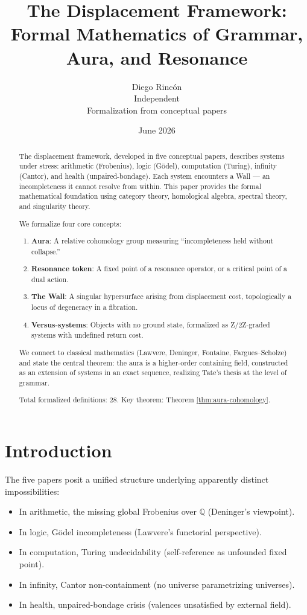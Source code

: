 \documentclass[12pt]{article}
\title{The Displacement Framework: Formal Mathematics of Grammar, Aura, and Resonance}
\author{Diego Rinc\'on\\
\small Independent\\
\small Formalization from conceptual papers}
\date{June 2026}
\theoremstyle{definition}
\theoremstyle{remark}
\begin{document}
\maketitle

\begin{abstract}
The displacement framework, developed in five conceptual papers, describes systems under stress: arithmetic (Frobenius), logic (G\"odel), computation (Turing), infinity (Cantor), and health (unpaired-bondage). Each system encounters a Wall --- an incompleteness it cannot resolve from within. This paper provides the formal mathematical foundation using category theory, homological algebra, spectral theory, and singularity theory.

We formalize four core concepts:
\begin{enumerate}
\item \textbf{Aura}: A relative cohomology group measuring ``incompleteness held without collapse.''
\item \textbf{Resonance token}: A fixed point of a resonance operator, or a critical point of a dual action.
\item \textbf{The Wall}: A singular hypersurface arising from displacement cost, topologically a locus of degeneracy in a fibration.
\item \textbf{Versus-systems}: Objects with no ground state, formalized as Z/2Z-graded systems with undefined return cost.
\end{enumerate}

We connect to classical mathematics (Lawvere, Deninger, Fontaine, Fargues--Scholze) and state the central theorem: the aura is a higher-order containing field, constructed as an extension of systems in an exact sequence, realizing Tate's thesis at the level of grammar.

Total formalized definitions: 28. Key theorem: Theorem \ref{thm:aura-cohomology}.
\end{abstract}

\section{Introduction}

The five papers posit a unified structure underlying apparently distinct impossibilities:
\begin{itemize}
\item In arithmetic, the missing global Frobenius over $\mathbb{Q}$ (Deninger's viewpoint).
\item In logic, G\"odel incompleteness (Lawvere's functorial perspective).
\item In computation, Turing undecidability (self-reference as unfounded fixed point).
\item In infinity, Cantor non-containment (no universe parametrizing universes).
\item In health, unpaired-bondage crisis (valences unsatisfied by external field).
\end{itemize}
\end{document}
